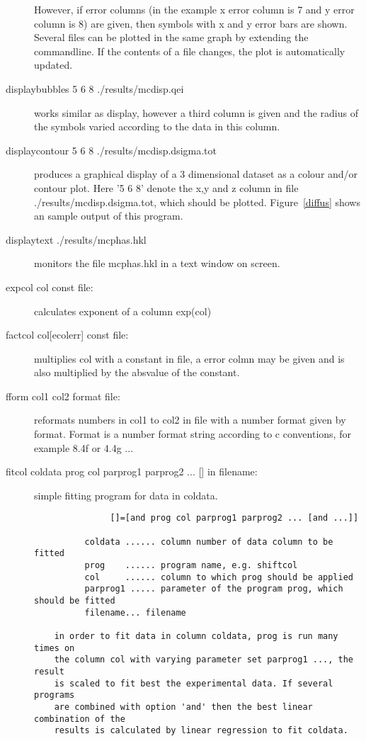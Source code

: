 \begin{description}
However, if error columns (in the example x error column is 7 and y error column is 8)
are given, then symbols with x and y error bars are shown. Several files
can be plotted in the same graph by extending the commandline. If the contents of a file
changes, the plot is automatically updated.
\item [\prg displaybubbles\index{displaybubbles}  5 6 8 ./results/mcdisp.qei] works similar as %
display, however
a third column is given and the radius of the symbols varied according to the data in 
this column.
\item [\prg displaycontour\index{displaycontour} 5 6 8 ./results/mcdisp.dsigma.tot] produces a %
graphical
display of a 3 dimensional dataset as a colour and/or contour plot. Here '5 6 8' 
denote the x,y and z column in file {\prg ./results/mcdisp.dsigma.tot}, which should
be plotted. Figure~\ref{diffus} shows an sample output of this program.
\item [\prg displaytext\index{displaytext} ./results/mcphas.hkl] monitors the file mcphas.hkl in %
a text window
on screen.
\item [\prg expcol\index{expcol} col const file:] calculates exponent of a column exp(col) 
\item [\prg factcol\index{factcol} col{[ecolerr]} const file:] multiplies col with a constant in file,
a error colmn may be given and is also multiplied by the absvalue of the constant.
\item [\prg fform\index{fform} col1 col2 format file:] reformats numbers in col1 to col2 in file %
with
             a number format given by format. Format is a number format string according
             to c conventions, for example 8.4f or 4.4g  ...             
\item [\prg fitcol coldata prog col parprog1 parprog2 ... {[]} in filename:]
simple fitting program for data in coldata.
\begin{verbatim}
               []=[and prog col parprog1 parprog2 ... [and ...]]

          coldata ...... column number of data column to be fitted
          prog    ...... program name, e.g. shiftcol
          col     ...... column to which prog should be applied
          parprog1 ..... parameter of the program prog, which should be fitted
          filename... filename

    in order to fit data in column coldata, prog is run many times on
    the column col with varying parameter set parprog1 ..., the result
    is scaled to fit best the experimental data. If several programs
    are combined with option 'and' then the best linear combination of the
    results is calculated by linear regression to fit coldata.


\end{verbatim}
\end{description}
